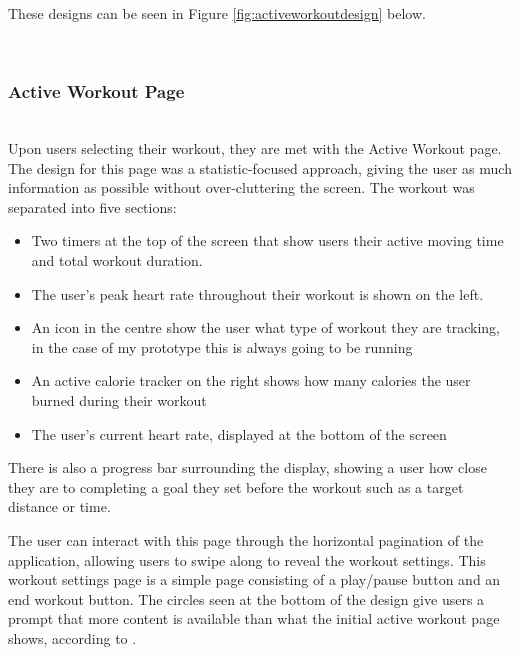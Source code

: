 \documentclass{l4proj}
\begin{document}
These designs can be seen in Figure \ref{fig:activeworkoutdesign} below.

\noindent\mbox{}\\
\subsubsection{Active Workout Page}
\label{sec:activeworkoutsubsection}
\noindent\mbox{}\\


Upon users selecting their workout, they are met with the Active Workout page. The design for this page was a statistic-focused approach, giving the user as much information as possible without over-cluttering the screen. The workout was separated into five sections:

\begin{itemize}
    \item Two timers at the top of the screen that show users their active moving time and total workout duration.
    \item The user’s peak heart rate throughout their workout is shown on the left.
    \item An icon in the centre show the user what type of workout they are tracking, in the case of my prototype this is always going to be running
    \item An active calorie tracker on the right shows how many calories the user burned during their workout
    \item The user’s current heart rate, displayed at the bottom of the screen
\end{itemize}

There is also a progress bar surrounding the display, showing a user how close they are to completing a goal they set before the workout such as a target distance or time.

The user can interact with this page through the horizontal pagination of the application, allowing users to swipe along to reveal the workout settings. This workout settings page is a simple page consisting of a play/pause button and an end workout button. The circles seen at the bottom of the design give users a prompt that more content is available than what the initial active workout page shows, according to \cite{PageIndicators}. 
\end{document}
